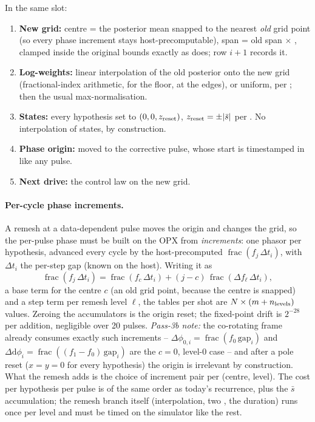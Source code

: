 In the same slot:
\begin{enumerate}[nosep]
  \item \textbf{New grid:} centre = the posterior mean snapped to the nearest
    \emph{old} grid point (so every phase increment stays host-precomputable),
    span = old span $\times$ , clamped inside the
    original bounds exactly as  does;
     row $i+1$ records it.
  \item \textbf{Log-weights:} linear interpolation of the old posterior onto the
    new grid (fractional-index arithmetic,  for the floor,
     at the edges), or uniform, per
    ; then the usual max-normalisation.
  \item \textbf{States:} every hypothesis set to $(0, 0, z_{\rm reset})$,
    $z_{\rm reset} = \pm|\bar s|$ per . No interpolation of
    states, by construction.
  \item \textbf{Phase origin:} moved to the corrective pulse, whose start is
    timestamped in  like any pulse.
  \item \textbf{Next drive:} the control law on the new grid.
\end{enumerate}

\paragraph{Per-cycle phase increments.} A remesh at a data-dependent pulse
moves the origin and changes the grid, so the per-pulse phase must be built on
the OPX from \emph{increments}: one phasor per hypothesis, advanced every cycle
by the host-precomputed $\operatorname{frac}(f_j\,\Delta t_i)$, with $\Delta t_i$
the per-step gap (known on the host). Writing it as
\[
  \operatorname{frac}(f_j\,\Delta t_i) = \operatorname{frac}(f_c\,\Delta t_i) + (j - c)\,\operatorname{frac}(\Delta f_\ell\,\Delta t_i),
\]
a base term for the centre $c$ (an old grid point, because the centre is
snapped) and a step term per remesh level $\ell$, the tables per shot are
$N \times (m + n_{\rm levels})$ values. Zeroing the accumulators is the origin
reset; the fixed-point drift is $2^{-28}$ per addition, negligible over 20
pulses. \emph{Pass-3b note:} the co-rotating frame already consumes exactly
such increments -- $\Delta\phi_{0,i} = \operatorname{frac}(f_0\,\mathrm{gap}_i)$ and
$\Delta\mathrm{d}\phi_i = \operatorname{frac}((f_1 - f_0)\,\mathrm{gap}_i)$ are the
$c = 0$, level-0 case -- and after a pole reset ($x = y = 0$ for every
hypothesis) the origin is irrelevant by construction. What the remesh adds is
the choice of increment pair per (centre, level). The cost per hypothesis per
pulse is of the same order as today's recurrence, plus the $\bar s$
accumulation; the remesh branch itself (interpolation, two
, the duration) runs once per level and must be timed on the
simulator like the rest.

